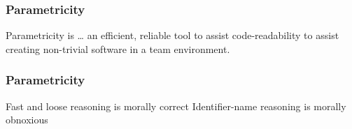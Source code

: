 \begin{frame}[fragile]
\frametitle{Parametricity}
\begin{block}{Parametricity is \ldots}
an efficient, reliable tool to assist code-readability to assist creating non-trivial software in a team environment.
\end{block}
\end{frame}

\begin{frame}[fragile]
\frametitle{Parametricity}
\begin{block}{Fast and loose reasoning is morally correct}
Identifier-name reasoning is morally obnoxious
\end{block}
\end{frame}
